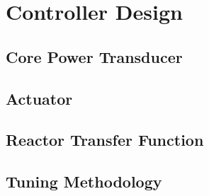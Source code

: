 \chapter{Controller Design}
\label{Chapter:Design}

\section{Core Power Transducer}

\section{Actuator}

\section{Reactor Transfer Function}

\section{Tuning Methodology}

